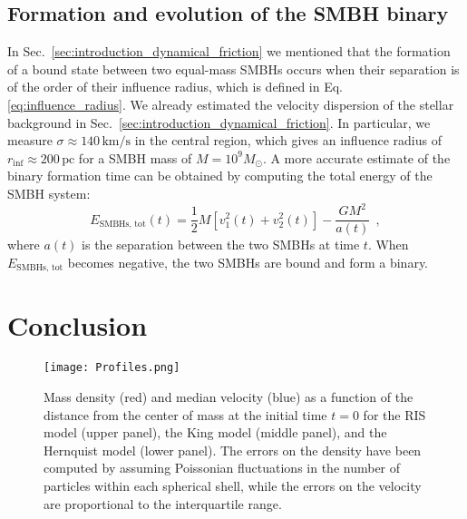 \documentclass[fleqn,usenatbib]{mnras}
\begin{document}
\subsection{Formation and evolution of the SMBH binary}\label{sec:analysis_binary}
In Sec.~\ref{sec:introduction_dynamical_friction} we mentioned that the formation of a bound state between two equal-mass SMBHs occurs when their separation is of the order of their influence radius, which is defined in Eq. \ref{eq:influence_radius}.
We already estimated the velocity dispersion of the stellar background in Sec.~\ref{sec:introduction_dynamical_friction}.
In particular, we measure $\sigma \approx 140 \,\text{km/s}$ in the central region, which gives an influence radius of $r_\text{inf} \approx 200 \,\text{pc}$ for a SMBH mass of $M=10^9 M_\odot$.
A more accurate estimate of the binary formation time can be obtained by computing the total energy of the SMBH system:
\begin{equation}
    E_\text{SMBHs, tot}(t) = \dfrac{1}{2} M \left[v_1^2(t) + v_2^2(t)\right] - \dfrac{GM^2}{a(t)} \:\: ,
    \label{eq:total_energy_SMBHs}
\end{equation}
where $a(t)$ is the separation between the two SMBHs at time $t$.
When $E_\text{SMBHs, tot}$ becomes negative, the two SMBHs are bound and form a binary.



\section{Conclusion}\label{sec:conclusion}


\begin{figure}\centering
	\texttt{[image: Profiles.png]}
    \caption{Mass density (red) and median velocity (blue) as a function of the distance from the center of mass at the initial time $t=0$ for the RIS model (upper panel), the King model (middle panel), and the Hernquist model (lower panel). The errors on the density have been computed by assuming Poissonian fluctuations in the number of particles within each spherical shell, while the errors on the velocity are proportional to the interquartile range.}
    \label{fig:profiles}
\end{figure}
\end{document}
